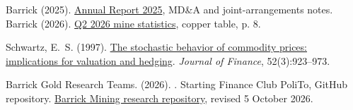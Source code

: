 \begin{thebibliography}{}
Barrick (2025). \href{https://s25.q4cdn.com/322814910/files/doc_financial/annual_reports/2025/Barrick_Annual_Report_2025.pdf}{Annual Report 2025}, MD\&A and joint-arrangements notes.
Barrick (2026). \href{https://s25.q4cdn.com/322814910/files/doc_financial/quarterly_results/2026/q2/Barrick_Q2_2026_Mine_Stats.pdf}{Q2 2026 mine statistics}, copper table, p. 8.

Schwartz, E.~S. (1997). \href{https://doi.org/10.1111/j.1540-6261.1997.tb02721.x}{The stochastic behavior of commodity prices: implications for valuation and hedging}. {\em Journal of Finance}, 52(3):923--973.

Barrick Gold Research Teams. (2026).
.
\newblock Starting Finance Club PoliTo, GitHub repository.
\newblock \href{https://github.com/StartingFinanceClubPoliTo/Research/tree/main/Barrick-Gold/Barrick\%20Mining\%20PAPER}{Barrick Mining research repository}, revised 5 October 2026.

\end{thebibliography}
